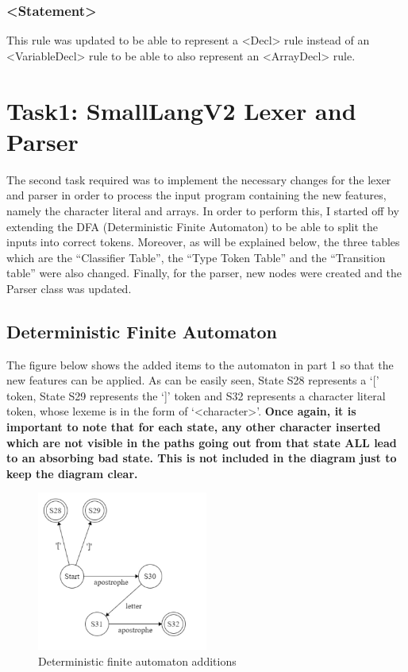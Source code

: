 \documentclass{article}
\newcommand{\quotes}[1]{``#1''}
\begin{document}
				\subsubsection{\textless Statement\textgreater}
				
				This rule was updated to be able to represent a \textless Decl\textgreater{} rule instead of an \textless VariableDecl\textgreater{} rule to be able to also represent an \textless ArrayDecl\textgreater{} rule.
				
				
				\section{Task1: SmallLangV2 Lexer and Parser}
				
				The second task required was to implement the necessary changes for the lexer and parser in order to process the input program containing the new features, namely the character literal and arrays. In order to perform this, I started off by extending the DFA (Deterministic Finite Automaton) to be able to split the inputs into correct tokens. Moreover, as will be explained below, the three tables which are the \quotes{Classifier Table}, the \quotes{Type Token Table} and the \quotes{Transition table} were also changed. Finally, for the parser, new nodes were created and the Parser class was updated. 
				
				\subsection{Deterministic Finite Automaton}
				
				The figure below shows the added items to the automaton in part 1 so that the new features can be applied. As can be easily seen, State S28 represents a `[' token, State S29 represents the `]' token and S32 represents a character literal token, whose lexeme is in the form of `\textless character\textgreater'. \textbf{Once again, it is important to note that for each state, any other character inserted which are not visible in the paths going out from that state ALL lead to an absorbing bad state. This is not included in the diagram just to keep the diagram clear.}
				
				\begin{center}
					\begin{figure}[H]
			 			\includegraphics[width=0.5\textwidth]{part2automaton.jpeg}
			 			\centering
			  			\caption{Deterministic finite automaton additions}
			  			\label{fig:automaton}
					\end{figure}
				\end{center}
				
\end{document}
